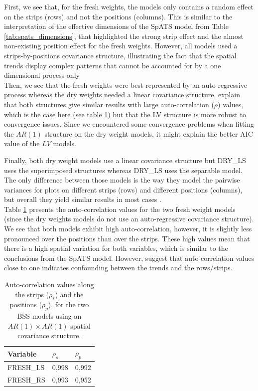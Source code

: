 First, we see that, for the fresh weights, the models only contains a random effect on the strips (rows) and not the positions (columns). This is similar to the interpretation of the effective dimensions of the SpATS model from Table \ref{tab:spats_dimensions}, that highlighted the strong strip effect and the almost non-existing position effect for the fresh weights. However, all models used a strips-by-positions covariance structure, illustrating the fact that the spatial trends display complex patterns that cannot be accounted for by a one dimensional process only \\

Then, we see that the fresh weights were best represented by an auto-regressive process whereas the dry weights needed a linear covariance structure. \textcite{piepho_linear_2010} explain that both structures give similar results with large auto-correlation ($\rho$) values, which is the case here (see table \ref{tab:BSS_variance_values}) but that the LV structure is more robust to convergence issues. Since we encountered some convergence problems when fitting the $AR(1)$ structure on the dry weight models, it might explain the better AIC value of the $LV$ models.

Finally, both dry weight models use a linear covariance structure but DRY\_LS uses the superimposed structures whereas DRY\_LS uses the separable model. The only difference between those models is the way they model the pairwise variances for plots on different strips (rows) and different positions (columns), but overall they yield similar results in most cases \parencite{piepho_linear_2010}.\\

Table \ref{tab:BSS_variance_values} presents the auto-correlation values for the two fresh weight models (since the dry weights models do not use an auto-regressive covariance structure). We see that both models exhibit high auto-correlation, however, it is slightly less pronounced over the positions than over the strips. These high values mean that there is a high spatial variation for both variables, which is similar to the conclusions from the SpATS model. However, \textcite{piepho_problems_2015} suggest that auto-correlation values close to one indicates confounding between the trends and the rows/strips.

\begin{table}[htbp]
  \centering
  \caption[Auto-correlation values for the BSS models]{Auto-correlation values along the strips ($\rho_{s}$) and the positions ($\rho_{p}$), for the two BSS models using an $AR(1) \times AR(1)$ spatial covariance structure.}
    \begin{tabular}{lrr}
    \toprule
    Variable & \multicolumn{1}{l}{$\rho_{s}$} & \multicolumn{1}{l}{$\rho_{p}$} \\
    \midrule
    FRESH\_LS &   0,998    &    0,992 \\
    FRESH\_RS &   0,993    &   0,952  \\
    \bottomrule
    \end{tabular}%
  \label{tab:BSS_variance_values}%
\end{table}%

